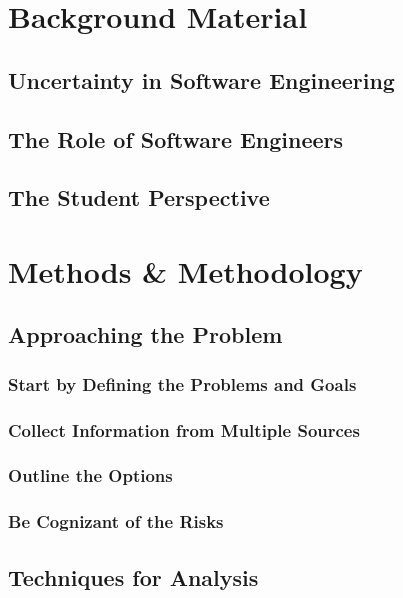 \documentclass[a4paper,12pt]{report}
\begin{document}
\chapter{Background Material}
\section{Uncertainty in Software Engineering}
\section{The Role of Software Engineers}
\section{The Student Perspective}

\chapter{Methods \& Methodology}
\section{Approaching the Problem}
\subsection{Start by Defining the Problems and Goals}
\subsection{Collect Information from Multiple Sources}
\subsection{Outline the Options}
\subsection{Be Cognizant of the Risks}
\section{Techniques for Analysis}
\end{document}
